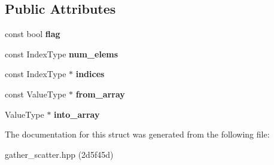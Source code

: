 \subsection*{Public Attributes}
\begin{DoxyCompactItemize}
\item 
\mbox{\label{structGatherScatter_ae0a023c43a44d3398c337759f73c450a}} 
const bool {\bfseries flag}
\item 
\mbox{\label{structGatherScatter_a7a77a08c144b7640c2e595ffcb95e9f6}} 
const Index\+Type {\bfseries num\+\_\+elems}
\item 
\mbox{\label{structGatherScatter_acfd3e8f7792e7e8d84558210c80feb8d}} 
const Index\+Type $\ast$ {\bfseries indices}
\item 
\mbox{\label{structGatherScatter_adbdf8c559625f452f62843c36a629993}} 
const Value\+Type $\ast$ {\bfseries from\+\_\+array}
\item 
\mbox{\label{structGatherScatter_a389b25cdf1bee5084d19f6df1ea53937}} 
Value\+Type $\ast$ {\bfseries into\+\_\+array}
\end{DoxyCompactItemize}


The documentation for this struct was generated from the following file\+:\begin{DoxyCompactItemize}
\item 
gather\+\_\+scatter.\+hpp (2d5f45d)\end{DoxyCompactItemize}
